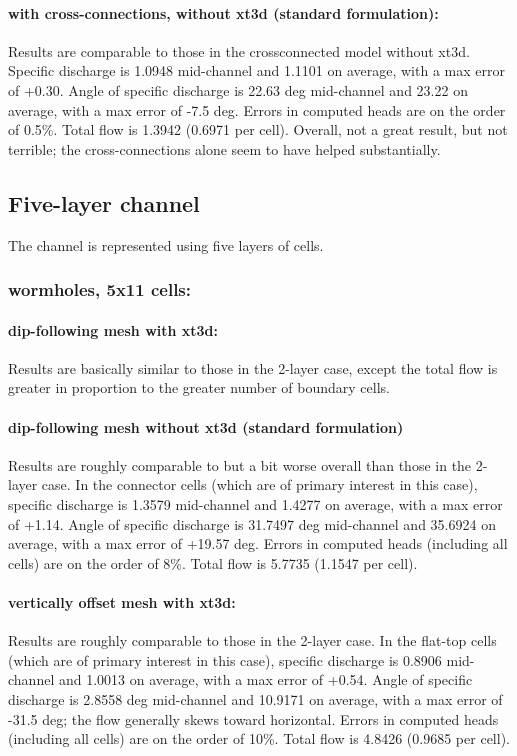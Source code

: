 \documentclass{article}
\begin{document}
\paragraph{with cross-connections, without xt3d (standard formulation):} Results are comparable to those in the crossconnected model without xt3d. Specific discharge is 1.0948 mid-channel and 1.1101 on average, with a max error of +0.30. Angle of specific discharge is 22.63 deg mid-channel and 23.22 on average, with a max error of -7.5 deg. Errors in computed heads are on the order of 0.5\%. Total flow is 1.3942 (0.6971 per cell). Overall, not a great result, but not terrible; the cross-connections alone seem to have helped substantially.

\subsection{Five-layer channel}
The channel is represented using five layers of cells.

\subsubsection{wormholes, 5x11 cells:}

\paragraph{dip-following mesh with xt3d:} Results are basically similar to those in the 2-layer case, except the total flow is greater in proportion to the greater number of boundary cells.

\paragraph{dip-following mesh without xt3d (standard formulation)} Results are roughly comparable to but a bit worse overall than those in the 2-layer case. In the connector cells (which are of primary interest in this case), specific discharge is 1.3579 mid-channel and 1.4277 on average, with a max error of +1.14. Angle of specific discharge is 31.7497 deg mid-channel and 35.6924 on average, with a max error of +19.57 deg. Errors in computed heads (including all cells) are on the order of 8\%. Total flow is 5.7735 (1.1547 per cell). 

\paragraph{vertically offset mesh with xt3d:} Results are roughly comparable to those in the 2-layer case. In the flat-top cells (which are of primary interest in this case), specific discharge is 0.8906 mid-channel and 1.0013 on average, with a max error of +0.54. Angle of specific discharge is 2.8558 deg mid-channel and 10.9171 on average, with a max error of -31.5 deg; the flow generally skews toward horizontal. Errors in computed heads (including all cells) are on the order of 10\%. Total flow is 4.8426 (0.9685 per cell).
\end{document}
